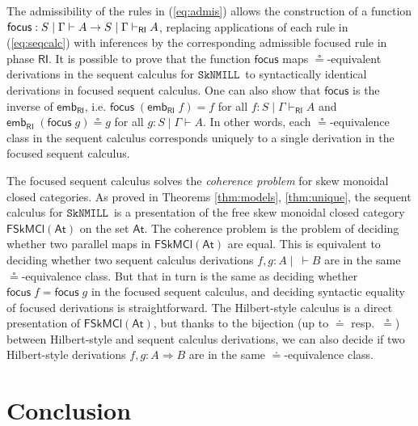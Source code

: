 \documentclass[copyright,creativecommons]{eptcs}
\theoremstyle{definition}
\newcommand{\RI}{\mathsf{RI}}
\newcommand{\SkNMILL}{$\mathtt{SkNMILL}$}
\newcommand{\FSkMCC}{\mathsf{FSkMCl}}
\begin{document}
The admissibility of the rules in (\ref{eq:admis}) allows the construction of a function $\mathsf{focus} : S \mid \Gamma \vdash A \to \linebreak S \mid \Gamma \vdash_\RI A$, replacing applications of each rule in (\ref{eq:seqcalc}) with inferences by the corresponding admissible focused rule in phase $\RI$.
It is possible to prove that the function $\mathsf{focus}$ maps  $\circeq$-equivalent derivations in the sequent calculus for \SkNMILL\ to syntactically identical derivations in focused sequent calculus. One can also show that $\mathsf{focus}$ is the inverse of $\mathsf{emb}_\RI$, i.e. $\mathsf{focus}\;(\mathsf{emb}_\RI \;f) = f$ for all $f : S \mid \Gamma \vdash_\RI A$ and $\mathsf{emb}_\RI\;(\mathsf{focus}\;g) \circeq g$ for all $g : S \mid \Gamma \vdash A$. In other words, each $\circeq$-equivalence class in the sequent calculus corresponds uniquely to a single derivation in the focused sequent calculus.

The focused sequent calculus solves the \emph{coherence problem} for skew monoidal closed categories.
As proved in Theorems \ref{thm:models}, \ref{thm:unique}, the sequent calculus for \SkNMILL\ is a presentation of the free skew monoidal closed category $\FSkMCC(\mathsf{At})$ on the set $\mathsf{At}$. The coherence problem is the problem of deciding whether two parallel maps in $\FSkMCC(\mathsf{At})$ are equal. 
This is equivalent to deciding whether two sequent calculus derivations $f,g : A \mid ~ \vdash B$ are in the same $\circeq$-equivalence class. But that in turn is the same as deciding whether $\mathsf{focus}\;f = \mathsf{focus}\;g$ in the focused sequent calculus, and deciding syntactic equality of focused derivations is straightforward. The Hilbert-style calculus is a direct presentation of $\FSkMCC(\mathsf{At})$, but thanks to the bijection (up to $\doteq$ resp.\ $\circeq$) between Hilbert-style and sequent calculus derivations, we can also decide if two Hilbert-style derivations $f, g : A \Rightarrow B$ are in the same $\doteq$-equivalence class.

\section{Conclusion}
\end{document}
